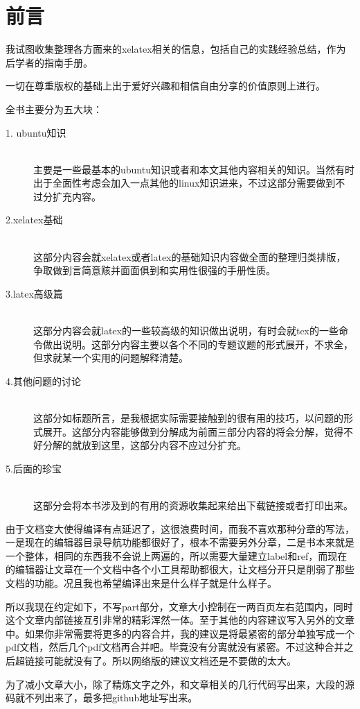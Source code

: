 \documentclass[11pt,oneside]{book}
\begin{document}
\frontmatter   

\author{万泽}
\titleLB

\chapter*{前言}
\begin{common-format}
我试图收集整理各方面来的xelatex相关的信息，包括自己的实践经验总结，作为后学者的指南手册。

一切在尊重版权的基础上出于爱好兴趣和相信自由分享的价值原则上进行。

全书主要分为五大块：
\begin{description}
\item[1. ubuntu知识] \hfill \\
主要是一些最基本的ubuntu知识或者和本文其他内容相关的知识。当然有时出于全面性考虑会加入一点其他的linux知识进来，不过这部分需要做到不过分扩充内容。
\item[2.xelatex基础] \hfill \\
这部分内容会就xelatex或者latex的基础知识内容做全面的整理归类排版，争取做到言简意赅并面面俱到和实用性很强的手册性质。
\item[3.latex高级篇] \hfill \\
这部分内容会就latex的一些较高级的知识做出说明，有时会就tex的一些命令做出说明。这部分内容主要以各个不同的专题议题的形式展开，不求全，但求就某一个实用的问题解释清楚。
\item[4.其他问题的讨论] \hfill \\
这部分如标题所言，是我根据实际需要接触到的很有用的技巧，以问题的形式展开。这部分内容能够做到分解成为前面三部分内容的将会分解，觉得不好分解的就放到这里，这部分内容不应过分扩充。
\item[5.后面的珍宝] \hfill \\
这部分会将本书涉及到的有用的资源收集起来给出下载链接或者打印出来。
\end{description}

由于文档变大使得编译有点延迟了，这很浪费时间，而我不喜欢那种分章的写法，一是现在的编辑器目录导航功能都很好了，根本不需要另外分章，二是书本来就是一个整体，相同的东西我不会说上两遍的，所以需要大量建立label和ref，而现在的编辑器让文章在一个文档中各个小工具帮助都很大，让文档分开只是削弱了那些文档的功能。况且我也希望编译出来是什么样子就是什么样子。

所以我现在约定如下，不写part部分，文章大小控制在一两百页左右范围内，同时这个文章内部链接互引非常的精彩浑然一体。至于其他的内容建议写入另外的文章中。如果你非常需要将更多的内容合并，我的建议是将最紧密的部分单独写成一个pdf文档，然后几个pdf文档再合并吧。毕竟没有分离就没有紧密。不过这种合并之后超链接可能就没有了。所以网络版的建议文档还是不要做的太大。

为了减小文章大小，除了精炼文字之外，和文章相关的几行代码写出来，大段的源码就不列出来了，最多把github地址写出来。
\end{common-format}
\end{document}
